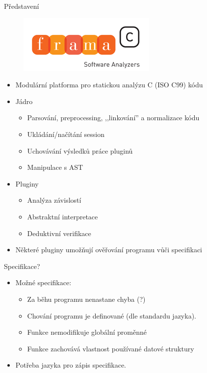 \documentclass[11pt]{beamer}
\begin{document}
\begin{frame}{Představení}

\begin{figure}
	\includegraphics[scale=0.3]{frama-c.png}
\end{figure}

\begin{itemize}
	\item<1-> Modulární platforma pro statickou analýzu C (ISO C99) kódu
	\item<2-> Jádro
		\begin{itemize}
				\item<4-> Parsování, preprocessing, ,,linkování'' a normalizace kódu
				\item<5-> Ukládání/načítání session
				\item<6-> Uchovávání výsledků práce pluginů
				\item<7-> Manipulace s AST
		\end{itemize}
	\item<3-> Pluginy
		\begin{itemize}
				\item<8-> Analýza závislostí
				\item<9-> Abstraktní interpretace
				\item<10-> Deduktivní verifikace
		\end{itemize}
	\item<11-> Některé pluginy umožňují ověřování programu vůči specifikaci
\end{itemize}

\end{frame}

\begin{frame}{Specifikace?}
	\begin{itemize}
		\item Možné specifikace:
			\begin{itemize}
				\pause \item Za běhu programu nenastane chyba \pause (?)
				\pause \item Chování programu je definované (dle standardu jazyka).
				\pause \item Funkce nemodifikuje globální proměnné
				\pause \item Funkce zachovává vlastnost používané datové struktury
			\end{itemize}
		\pause \item Potřeba jazyka pro zápis specifikace.
	\end{itemize}
\end{frame}
\end{document}
